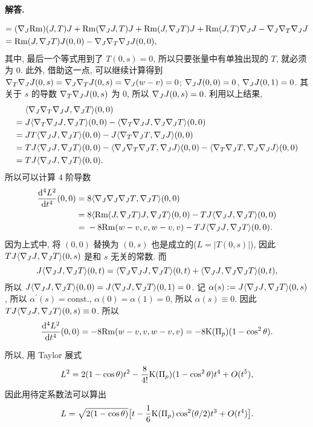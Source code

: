 \documentclass{ctexart}
\newenvironment{solution}{\par\noindent\textbf{解答. }}{\par}
\begin{document}
\begin{solution}
\begin{itemize}
\[\begin{aligned}
                ={} & (\nabla_{J}\mathrm{Rm})(J, T)J + \mathrm{Rm}(\nabla_{J}J, T)J + \mathrm{Rm}(J, \nabla_{J}T)J + \mathrm{Rm}(J, T)\nabla_{J}J - \nabla_{J}\nabla_{T}\nabla_{J}J \\
                ={} & \mathrm{Rm}(J, \nabla_{J}T)J(0, 0) - \nabla_{J}\nabla_{T}\nabla_{J}J(0, 0),
            \end{aligned}
        \]
        其中, 最后一个等式用到了 $T(0, s) = 0$, 所以只要张量中有单独出现的 $T$, 就必须为 $0$. 此外, 借助这一点, 可以继续计算得到 $\nabla_{T}\nabla_{J}J(0, s) = \nabla_{J}\nabla_{T}J(0, s) = \nabla_{J}(w - v) = 0$; $\nabla_{J}J(0, 0) = 0$, $\nabla_{J}J(0, 1) = 0$. 其关于 $s$ 的导数 $\nabla_{T}\nabla_{J}J(0, s)$ 为 $0$, 所以 $\nabla_{J}J(0, s) = 0$. 利用以上结果,
        \[
            \begin{aligned}
                {} & \langle {\nabla_{J}\nabla_{T}\nabla_{J}J}, {\nabla_{J}T} \rangle(0, 0) \\
                ={} & J\langle {\nabla_{T}\nabla_{J}J}, {\nabla_{J}T} \rangle(0, 0) - \langle {\nabla_{T}\nabla_{J}J}, {\nabla_{J}\nabla_{J}T} \rangle(0, 0) \\
                ={} & JT\langle {\nabla_{J}J}, {\nabla_{J}T} \rangle(0, 0) - J\langle {\nabla_{T}\nabla_{J}T}, {\nabla_{J}J} \rangle(0, 0) \\
                ={} & TJ\langle {\nabla_{J}J}, {\nabla_{J}T} \rangle(0, 0) - \langle {\nabla_{J}\nabla_{T}\nabla_{J}T}, {\nabla_{J}J} \rangle(0, 0) - \langle {\nabla_{T}\nabla_{J}T}, {\nabla_{J}\nabla_{J}J} \rangle(0, 0) \\
                ={} & TJ\langle {\nabla_{J}J}, {\nabla_{J}T} \rangle(0, 0).
            \end{aligned}
        \]
        所以可以计算 $4$ 阶导数
        \[
            \begin{aligned}
                \dfrac{\mathop{}\!\mathrm{d} ^4 L^2}{\mathop{}\!\mathrm{d} t^4}(0, 0) ={} & 8\langle {\nabla_{J}\nabla_{J}\nabla_{J}T}, {\nabla_{J}T} \rangle(0, 0) \\
                ={} & 8\langle {\mathrm{Rm}(J, \nabla_{J}T)J}, {\nabla_{J}T} \rangle(0, 0) - TJ\langle {\nabla_{J}J}, {\nabla_{J}T} \rangle(0, 0) \\
                ={} & -8\mathrm{Rm}(w - v, v, w - v, v) - TJ\langle {\nabla_{J}J}, {\nabla_{J}T} \rangle(0, 0).
            \end{aligned}
        \]
        因为上式中, 将 $(0, 0)$ 替换为 $(0, s)$ 也是成立的($L = |T(0, s)|$), 因此 $TJ\langle {\nabla_{J}J}, {\nabla_{J}T} \rangle(0, s)$ 是和 $s$ 无关的常数. 而 
        \[
            J\langle {\nabla_{J}J}, {\nabla_{J}T} \rangle(0, t) = \langle {\nabla_{J}\nabla_{J}J}, {\nabla_{J}T} \rangle(0, t) + \langle {\nabla_{J}J}, {\nabla_{J}\nabla_{J}T} \rangle(0, t),
        \]
        所以 $J\langle {\nabla_{J}J}, {\nabla_{J}T} \rangle(0, 0) = J\langle {\nabla_{J}J}, {\nabla_{J}T} \rangle(0, 1) = 0$. 记 $\alpha(s) := J\langle {\nabla_{J}J}, {\nabla_{J}T} \rangle(0, s)$, 所以 $\alpha^\prime(s) = \mathrm{const.}$, $\alpha(0) = \alpha(1) = 0$, 所以 $\alpha(s) \equiv 0$. 因此 $TJ\langle {\nabla_{J}J}, {\nabla_{J}T} \rangle(0, s) \equiv 0$. 所以
        \[
            \dfrac{\mathop{}\!\mathrm{d} ^4 L^2}{\mathop{}\!\mathrm{d} t^4}(0, 0) = -8\mathrm{Rm}(w - v, v, w - v, v) = -8\mathrm{K}(\Pi_p)(1 - \cos^2 \theta).
        \]
    \end{itemize}
    所以, 用 Taylor 展式
    \[
        L^2 = 2(1 - \cos \theta) t^2 - \dfrac{8}{4!}\mathrm{K}(\Pi_p)(1 - \cos^2 \theta) t^4 + O(t^5),
    \]
    因此用待定系数法可以算出
    \[
        L = \sqrt{2(1 - \cos \theta)} \bigl[t - \dfrac{1}{6}\mathrm{K}(\Pi_p) \cos^2(\theta / 2) t^3 + O(t^4) \bigr].
    \]
\end{solution}
\end{document}
